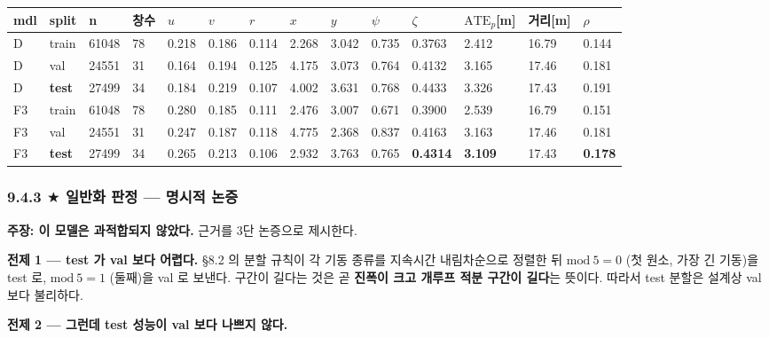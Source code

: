 \documentclass[10pt,a4paper]{article}
\begin{document}
\begin{center}\scriptsize\setlength{\tabcolsep}{3pt}
\begin{tabular}{@{}llllllllllllll@{}}
\toprule
\textbf{mdl} & \textbf{split} & \textbf{n} & \textbf{창수} & \textbf{$u$} & \textbf{$v$} & \textbf{$r$} & \textbf{$x$} & \textbf{$y$} & \textbf{$\psi$} & \textbf{$\zeta$} & \textbf{$\mathrm{ATE}_p$[m]} & \textbf{거리[m]} & \textbf{$\rho$} \\
\midrule
D & train & 61048 & 78 & 0.218 & 0.186 & 0.114 & 2.268 & 3.042 & 0.735 & 0.3763 & 2.412 & 16.79 & 0.144 \\
D & val & 24551 & 31 & 0.164 & 0.194 & 0.125 & 4.175 & 3.073 & 0.764 & 0.4132 & 3.165 & 17.46 & 0.181 \\
D & \textbf{test} & 27499 & 34 & 0.184 & 0.219 & 0.107 & 4.002 & 3.631 & 0.768 & 0.4433 & 3.326 & 17.43 & 0.191 \\
F3 & train & 61048 & 78 & 0.280 & 0.185 & 0.111 & 2.476 & 3.007 & 0.671 & 0.3900 & 2.539 & 16.79 & 0.151 \\
F3 & val & 24551 & 31 & 0.247 & 0.187 & 0.118 & 4.775 & 2.368 & 0.837 & 0.4163 & 3.163 & 17.46 & 0.181 \\
F3 & \textbf{test} & 27499 & 34 & 0.265 & 0.213 & 0.106 & 2.932 & 3.763 & 0.765 & \textbf{0.4314} & \textbf{3.109} & 17.43 & \textbf{0.178} \\
\bottomrule
\end{tabular}
\end{center}

\subsubsection*{9.4.3 $\bigstar$ 일반화 판정 --- 명시적 논증}

\textbf{주장: 이 모델은 과적합되지 않았다.} 근거를 3단 논증으로 제시한다.

\textbf{전제 1 --- test 가 val 보다 어렵다.} \S{}8.2 의 분할 규칙이 각 기동 종류를 지속시간 내림차순으로 정렬한 뒤 $\mathrm{mod}\ 5 = 0$ (첫 원소, 가장 긴 기동)을 test 로, $\mathrm{mod}\ 5 = 1$ (둘째)을 val 로 보낸다. 구간이 길다는 것은 곧 \textbf{진폭이 크고 개루프 적분 구간이 길다}는 뜻이다. 따라서 test 분할은 설계상 val 보다 불리하다.

\textbf{전제 2 --- 그런데 test 성능이 val 보다 나쁘지 않다.}
\end{document}
